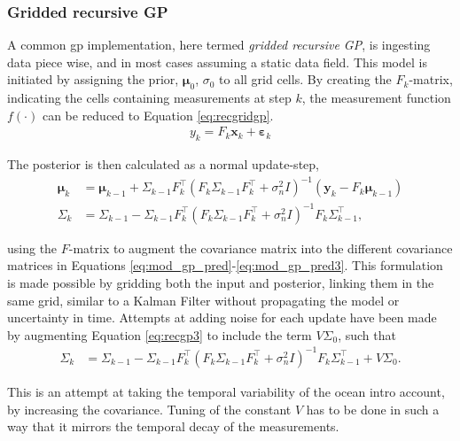 \subsubsection*{Gridded recursive GP}
A common \acrshort{gp} implementation\cite{fossum2019adaptive,stankiewicz2021adaptive,berget2018adaptive}, here termed \textit{gridded recursive GP}, is ingesting data piece wise, and in most cases assuming a static data field. This model is initiated by assigning the prior, $\mathbf{\mu}_0$, $\sigma_0$ to all grid cells. By creating the $F_k$-matrix, indicating the cells containing measurements at step $k$, the measurement function $f(\cdot)$ can be reduced to Equation \eqref{eq:recgridgp}.
\begin{align}
    \label{eq:recgridgp}
    y_k = F_k \mathbf{x}_k + \mathbf{\varepsilon}_k
\end{align}

The posterior is then calculated as a normal update-step, 
\begin{align}
    \label{eq:recgp2}
    \mathbf{\mu}_k &= \mathbf{\mu}_{k-1} + \Sigma_{k-1}F_k^{\intercal} (F_k\Sigma_{k-1}F_k^{\intercal} + \sigma_n^2 I)^{-1}(\mathbf{y}_k-F_k\mathbf{\mu}_{k-1}) \\
    \label{eq:recgp3}
    \Sigma_k &= \Sigma_{k-1} -  \Sigma_{k-1}F_k^{\intercal} (F_k\Sigma_{k-1}F_k^{\intercal} + \sigma_n^2 I)^{-1}F_k\Sigma_{k-1}^{\intercal},
\end{align}

using the $F$-matrix to augment the covariance matrix into the different covariance matrices in Equations \eqref{eq:mod_gp_pred}-\eqref{eq:mod_gp_pred3}. This formulation is made possible by gridding both the input and posterior, linking them in the same grid, similar to a Kalman Filter\cite{kalman1960new} without propagating the model or uncertainty in time. Attempts at adding noise for each update have been made\cite{berget2018adaptive} by augmenting Equation \eqref{eq:recgp3} to include the term $V\Sigma_0$, such that
\begin{align}
    \Sigma_k &= \Sigma_{k-1} -  \Sigma_{k-1}F_k^{\intercal} (F_k\Sigma_{k-1}F_k^{\intercal} + \sigma_n^2 I)^{-1}F_k\Sigma_{k-1}^{\intercal} + V\Sigma_0.
\end{align}

This is an attempt at taking the temporal variability of the ocean intro account, by increasing the covariance. Tuning of the constant $V$ has to be done in such a way that it mirrors the temporal decay of the measurements.  

